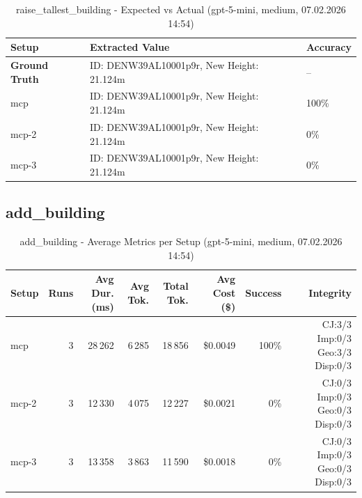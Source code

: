 \documentclass[a4paper,11pt]{article}
\begin{document}
\begin{table}[H]
\centering
\scriptsize
\caption{raise\_tallest\_building - Expected vs Actual (gpt-5-mini, medium, 07.02.2026 14:54)}
\begin{tabular}{l l l}
\toprule
Setup & Extracted Value & Accuracy \\
\midrule
\textbf{Ground Truth} & ID: DENW39AL10001p9r, New Height: 21.124m & -- \\
\midrule
mcp & ID: DENW39AL10001p9r, New Height: 21.124m & 100\% \\
mcp-2 & ID: DENW39AL10001p9r, New Height: 21.124m & 0\% \\
mcp-3 & ID: DENW39AL10001p9r, New Height: 21.124m & 0\% \\
\bottomrule
\end{tabular}
\end{table}

\clearpage

\subsection{add\_building}

\begin{table}[H]
\centering
\scriptsize
\caption{add\_building - Average Metrics per Setup (gpt-5-mini, medium, 07.02.2026 14:54)}
\label{tab:combined\_add\_building\_metrics\_20260207}
\begin{tabular}{l r r r r r r r}
\toprule
Setup & Runs & Avg Dur. (ms) & Avg Tok. & Total Tok. & Avg Cost (\$) & Success & Integrity \\
\midrule
mcp & 3 & 28\,262 & 6\,285 & 18\,856 & \$0.0049 & 100\% & CJ:3/3 Imp:0/3 Geo:3/3 Disp:0/3 \\
mcp-2 & 3 & 12\,330 & 4\,075 & 12\,227 & \$0.0021 & 0\% & CJ:0/3 Imp:0/3 Geo:0/3 Disp:0/3 \\
mcp-3 & 3 & 13\,358 & 3\,863 & 11\,590 & \$0.0018 & 0\% & CJ:0/3 Imp:0/3 Geo:0/3 Disp:0/3 \\
\bottomrule
\end{tabular}
\end{table}
\end{document}
